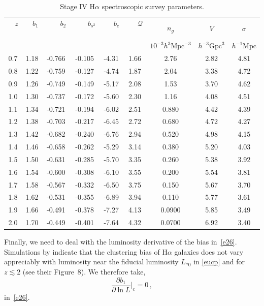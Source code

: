 \begin{table} 
\centering 
\caption{Stage IV H$\alpha$ spectroscopic survey parameters.} \label{tab1} 
\vspace*{0.2cm}
\begin{tabular}{|c|c|c|c|c|c|c|c|c|} 
\hline 
~~$z$~~ & ~~$b_{1}$~~ & ~~~~$b_{2}$~~~~ & ~~~~$b_{s^{2}}$~~~~ & ~~~$b_{e}$~~~ & ~~~$\mathcal{Q}$~~~ & $n_{g}$ & $V$ & $\sigma$ \\ 
 & & & & & & $10^{-3}h^{3} \mathrm{Mpc}^{-3}$ & $h^{-3} \mathrm{Gpc}^{3}$ & $h^{-1} \mathrm{Mpc}$\\
\hline\hline 
0.7 & 1.18 & -0.766 & -0.105 & -4.31 & 1.66 & 2.76 & 2.82 & 4.81 \\
0.8 & 1.22 & -0.759 & -0.127 & -4.74 & 1.87 & 2.04 & 3.38 & 4.72 \\
0.9 & 1.26 & -0.749 & -0.149 & -5.17 & 2.08 & 1.53 & 3.70 & 4.62 \\
1.0 & 1.30 & -0.737 & -0.172 & -5.60 & 2.30 & 1.16 & 4.08 & 4.51 \\
1.1 & 1.34 & -0.721 & -0.194 & -6.02 & 2.51 & 0.880 & 4.42 & 4.39 \\
1.2 & 1.38 & -0.703 & -0.217 & -6.45 & 2.72 & 0.680 & 4.72 & 4.27 \\
1.3 & 1.42 & -0.682 & -0.240 & -6.76 & 2.94 & 0.520 & 4.98 & 4.15 \\
1.4 & 1.46 & -0.658 & -0.262 & -5.29 & 3.14 & 0.380 & 5.20 & 4.03 \\
1.5 & 1.50 & -0.631 & -0.285 & -5.70 & 3.35 & 0.260 & 5.38 & 3.92 \\
1.6 & 1.54 & -0.600 & -0.308 & -6.10 & 3.55 & 0.200 & 5.54 & 3.81 \\
1.7 & 1.58 & -0.567 & -0.332 & -6.50 & 3.75 & 0.150 & 5.67 & 3.70 \\
1.8 & 1.62 & -0.531 & -0.355 & -6.89 & 3.94 & 0.110 & 5.77 & 3.61 \\
1.9 & 1.66 & -0.491 & -0.378 & -7.27 & 4.13 & 0.0900 & 5.85 & 3.49 \\
2.0 & 1.70 & -0.449 & -0.401 & -7.64 & 4.32 & 0.0700 & 6.92 & 3.40 \\ \hline
\end{tabular}
\end{table}
Finally, we need to deal with the luminosity derivative of the bias in~\eqref{e26}. Simulations by \cite{Pan:2019dxa} indicate that the  clustering bias of H$\alpha$ galaxies does not vary appreciably with luminosity near the fiducial luminosity $L_{*0}$ in \eqref{eucp} and for $z\lesssim 2$ (see their Figure~8). We therefore take,
\begin{equation}\label{b1l}
\frac{\partial b_1}{\partial \ln{L}}\bigg|_{\mathrm{c}}=0\,, 
\end{equation}
in~\eqref{e26}. 




